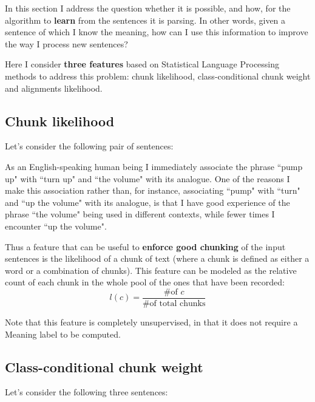 In this section I address the question whether it is possible, and how, for the algorithm to \textbf{learn} from the sentences it is parsing. In other words, given a sentence of which I know the meaning, how can I use this information to improve the way I process new sentences?

Here I consider \textbf{three features} based on Statistical Language Processing methods to address this problem: chunk likelihood, class-conditional chunk weight and alignments likelihood.

\subsection{Chunk likelihood} \label{ch3:ml:cl}
Let's consider the following pair of sentences:

As an English-speaking human being I immediately associate the phrase ``pump up" with ``turn up" and ``the volume" with its analogue. One of the reasons I make this association rather than, for instance, associating ``pump" with ``turn" and ``up the volume" with its analogue, is that I have good experience of the phrase ``the volume" being used in different contexts, while fewer times I encounter ``up the volume".

Thus a feature that can be useful to \textbf{enforce good chunking} of the input sentences is the likelihood of a chunk of text (where a chunk is defined as either a word or a combination of chunks). This feature can be modeled as the relative count of each chunk in the whole pool of the ones that have been recorded:
$$
l(c)=\frac{\text{\# of }c}{\text{\# of total chunks}}
$$

Note that this feature is completely unsupervised, in that it does not require a Meaning label to be computed.
\subsection{Class-conditional chunk weight} \label{ch3:ml:cc}
Let's consider the following three sentences:

